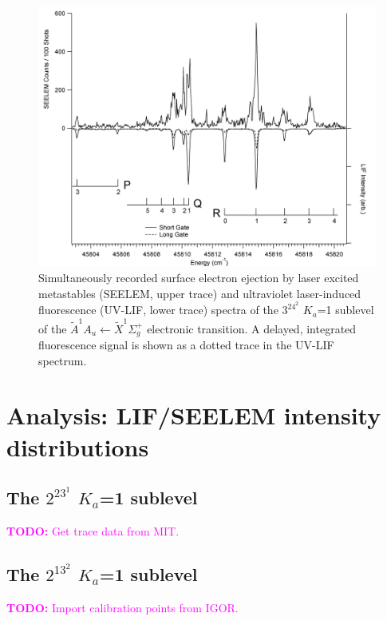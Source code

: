 \documentclass[12pt,draft]{mitthesis}
\newcommand{\TODO} [1]{\textcolor{magenta}{\textbf{TODO:} #1}}
\begin{document}
\begin{figure}
  \caption{
    Simultaneously recorded surface electron ejection by laser excited
    metastables (SEELEM, upper trace) and ultraviolet laser-induced
    fluorescence (UV-LIF, lower trace) spectra of the $3^24^2$ $K_a$=1
    sublevel of the $\tilde{A}^1A_u \leftarrow \tilde{X} ^1\Sigma_g^+$
    electronic transition. A delayed, integrated fluorescence signal
    is shown as a dotted trace in the UV-LIF spectrum.}
  \label{fig:spectrum-32b2}
  \centering
  \includegraphics[width=7.5in,angle=90]{spectrum-32b2.png}
\end{figure}

\section{Analysis: LIF/SEELEM intensity distributions}

\subsection{The $2^23^1$ $K_a$=1 sublevel}

\TODO{Get trace data from MIT.}

\subsection{The $2^13^2$ $K_a$=1 sublevel}

\TODO{Import calibration points from IGOR.}
\end{document}
